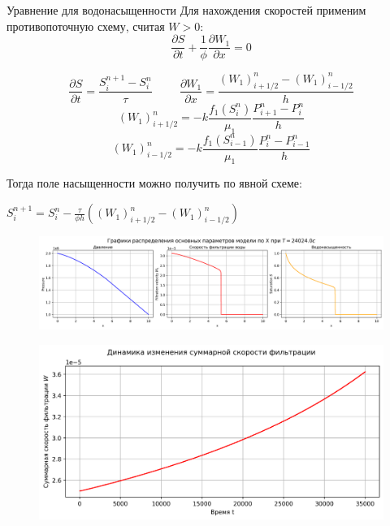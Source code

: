\documentclass[14pt, aspectratio=169]{beamer}
\begin{document}
\begin{frame}{Уравнение для водонасыщенности}
    Для нахождения скоростей применим противопоточную схему, считая $W > 0$:
    $$
    \frac{\partial S }{\partial t} + \frac{1}{\phi}\frac{\partial W_1}{\partial x} = 0
    $$

    $$
    \frac{\partial S}{\partial t} = \frac{S_i^{n+1} - S_i^n}{\tau} 
    \hspace{1cm}
    \frac{\partial W_1}{\partial x} = \frac{(W_{1})_{i+1/2}^{n} - (W_{1})_{i-1/2}^{n} }{h}
    $$
    $$
    (W_{1})_{i+1/2}^{n} = - k \frac{f_1(S_i^{n})}{\mu_1} \frac{P_{i+1}^{n} - P_{i}^{n}}{h}
    $$
    $$
    (W_{1})_{i-1/2}^{n} = - k \frac{f_1(S_{i-1}^{n})}{\mu_1} \frac{P_{i}^{n} - P_{i-1}^{n}}{h}
    $$
\end{frame}

\begin{frame}
    Тогда поле насыщенности можно получить по явной схеме:

    \begin{block}{}
    $
    S_i^{n+1} = S_i^n - \frac{\tau}{\phi h} \left( (W_{1})_{i+1/2}^{n} - (W_{1})_{i-1/2}^{n} \right)
    $
    \end{block}

    \begin{figure}
        \includegraphics[width=\linewidth]{impes-params-solution.png}
    \end{figure}
    
\end{frame}

\begin{frame}
    
    \begin{figure}
        \includegraphics[width=\linewidth]{impes-velocity-time.png}
    \end{figure}
    
\end{frame}
\end{document}
